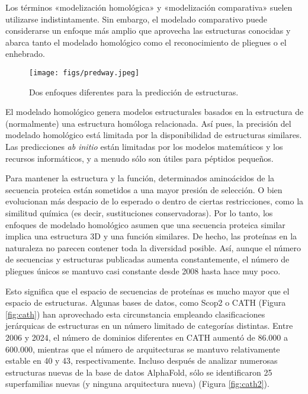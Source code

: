 \begin{table}[htbp]
\begin{mdframed}[backgroundcolor=black!10]
    \centering
    Los términos «modelización homológica» y «modelización comparativa» suelen utilizarse indistintamente. Sin embargo, el modelado comparativo puede considerarse un enfoque más amplio que aprovecha las estructuras conocidas y abarca tanto el modelado homológico como el reconocimiento de pliegues o el enhebrado.
    \end{mdframed}
\end{table}

\begin{figure}[h]
\centering
\texttt{[image: figs/predway.jpeg]}
\caption{Dos enfoques diferentes para la predicción de estructuras.}
\end{figure}

El modelado homológico genera modelos estructurales basados en la estructura de (normalmente) una estructura homóloga relacionada. Así pues, la precisión del modelado homológico está limitada por la disponibilidad de estructuras similares. Las predicciones \textit{ab initio} están limitadas por los modelos matemáticos y los recursos informáticos, y a menudo sólo son útiles para péptidos pequeños.

Para mantener la estructura y la función, determinados aminoácidos de la secuencia proteica están sometidos a una mayor presión de selección. O bien evolucionan más despacio de lo esperado o dentro de ciertas restricciones, como la similitud química (es decir, sustituciones conservadoras). Por lo tanto, los enfoques de modelado homológico asumen que una secuencia proteica similar implica una estructura 3D y una función similares. De hecho, las proteínas en la naturaleza no parecen contener toda la diversidad posible. Así, aunque el número de secuencias y estructuras publicadas aumenta constantemente, el número de pliegues únicos se mantuvo casi constante desde 2008 hasta hace muy poco.

Esto significa que el espacio de secuencias de proteínas es mucho mayor que el espacio de estructuras. Algunas bases de datos, como Scop2 o CATH (Figura \ref{fig:cath}) han aprovechado esta circunstancia empleando clasificaciones jerárquicas de estructuras en un número limitado de categorías distintas. Entre 2006 y 2024, el número de dominios diferentes en CATH aumentó de 86.000 a 600.000, mientras que el número de arquitecturas se mantuvo relativamente estable en 40 y 43, respectivamente. Incluso después de analizar numerosas estructuras nuevas de la base de datos AlphaFold, sólo se identificaron 25 superfamilias nuevas (y ninguna arquitectura nueva) (Figura \ref{fig:cath2}).

